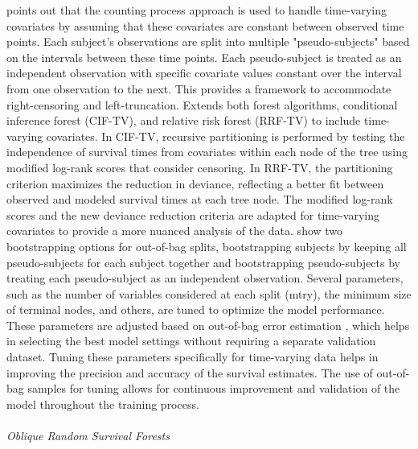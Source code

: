 \par \noindent \parencite{yao_ensemble_2022} points out that the counting process approach is used to handle time-varying covariates by assuming that these covariates are constant between observed time points. Each subject's observations are split into multiple "pseudo-subjects" based on the intervals between these time points. Each pseudo-subject is treated as an independent observation with specific covariate values constant over the interval from one observation to the next. This provides a framework to accommodate right-censoring and left-truncation. \parencite{yao_ensemble_2022} Extends both forest algorithms, conditional inference forest (CIF-TV), and relative risk forest (RRF-TV) to include time-varying covariates. In CIF-TV, recursive partitioning is performed by testing the independence of survival times from covariates within each node of the tree using modified log-rank scores that consider censoring. In RRF-TV, the partitioning criterion maximizes the reduction in deviance, reflecting a better fit between observed and modeled survival times at each tree node. The modified log-rank scores and the new deviance reduction criteria are adapted for time-varying covariates to provide a more nuanced analysis of the data. \parencite{yao_ensemble_2022} show two bootstrapping options for out-of-bag splits, bootstrapping subjects by keeping all pseudo-subjects for each subject together and bootstrapping pseudo-subjects by treating each pseudo-subject as an independent observation. Several parameters, such as the number of variables considered at each split (mtry), the minimum size of terminal nodes, and others, are tuned to optimize the model performance. These parameters are adjusted based on out-of-bag error estimation \parencite{yao_ensemble_2022}, which helps in selecting the best model settings without requiring a separate validation dataset. Tuning these parameters specifically for time-varying data helps in improving the precision and accuracy of the survival estimates. The use of out-of-bag samples for tuning allows for continuous improvement and validation of the model throughout the training process.
\\\\
\noindent \textit{Oblique Random Survival Forests}
